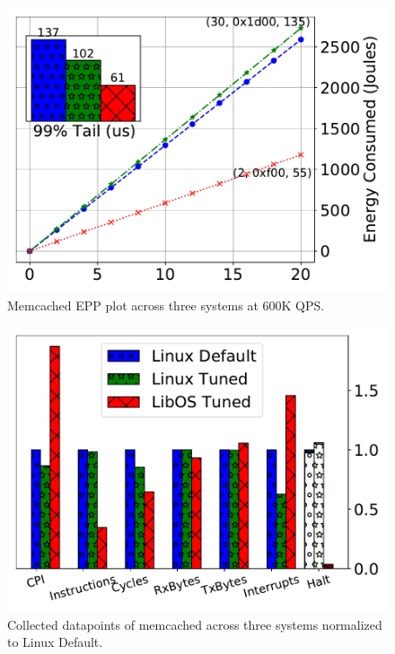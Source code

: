 \begin{figure}[t]
	\includegraphics[width=\columnwidth]{osdi_figures/mcd_600000_epp.pdf}
	\caption{Memcached EPP plot across three systems at 600K QPS.}
	\label{fig:mcd_600000_epp}
\end{figure}
\begin{figure}[t]
	\includegraphics[width=\columnwidth]{osdi_figures/mcd_600000_barplot.pdf}
	\caption{Collected datapoints of memcached across three systems normalized to Linux Default.}
	\label{fig:mcd_600000_bar}
\end{figure}
